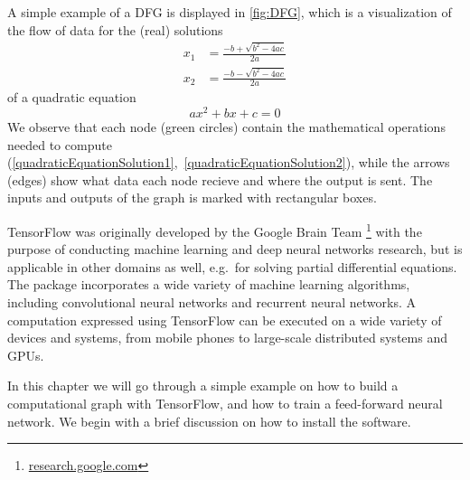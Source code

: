 \documentclass[twoside,english]{uiofysmaster}
\begin{document}
A simple example of a DFG is displayed in \autoref{fig:DFG}, which is a visualization of the flow of data
for the (real) solutions 
\begin{subequations}
\begin{align}
 x_1 &= \frac{-b + \sqrt{b^2 - 4ac}}{2a}  \label{quadraticEquationSolution1} \\
 x_2 &= \frac{-b - \sqrt{b^2 - 4ac}}{2a}
 \label{quadraticEquationSolution2}
\end{align}
\end{subequations}
of a quadratic equation
\begin{equation}
 ax^2 + bx + c = 0
 \label{quadraticEquation}
\end{equation}
We observe that each node (green circles)
contain the mathematical operations needed to compute
(\ref{quadraticEquationSolution1},~\ref{quadraticEquationSolution2}), while the arrows
(edges) show what data each node recieve and where
the output is sent. The inputs and outputs
of the graph is marked with rectangular
boxes. 

TensorFlow was originally developed by 
the Google Brain Team%
\footnote{\href{https://research.google.com/teams/brain/}{research.google.com}}
with the purpose of conducting machine learning and 
deep neural networks research, but is 
applicable in other domains as well, e.g.\ for
solving partial differential equations. 
The package incorporates
a wide variety of machine learning algorithms, including
convolutional neural networks and recurrent neural networks.
A computation expressed using TensorFlow can 
be executed on a wide variety of devices and systems, 
from mobile phones to large-scale distributed systems
and GPUs. 

In this chapter we will go through a simple 
example on how to build a computational graph 
with TensorFlow, and how to train a
feed-forward neural network. We begin with a brief discussion on how to install the software. 
\end{document}
